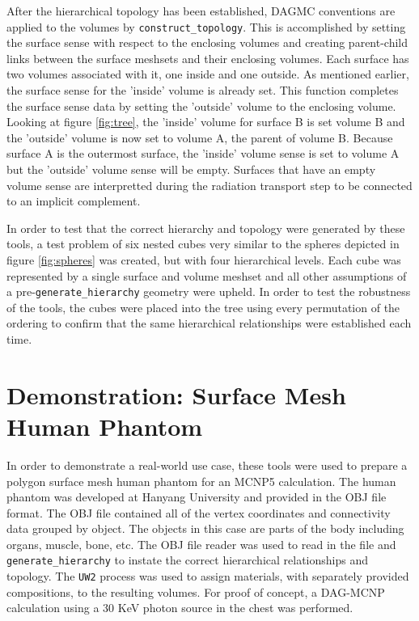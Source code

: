 \documentclass{anstrans}
\begin{document}
After the hierarchical topology has been established, DAGMC conventions are
applied to the volumes by \texttt{construct\_topology}.  This is accomplished
by setting the surface sense with respect to the enclosing volumes and
creating parent-child links between the surface meshsets and their enclosing
volumes.  Each surface has two volumes associated with it, one inside and one
outside.  As mentioned earlier, the surface sense for the 'inside' volume is
already set.  This function completes the surface sense data by setting the
'outside' volume to the enclosing volume.  Looking at figure \ref{fig:tree},
the 'inside' volume for surface B is set volume B and the 'outside' volume is
now set to volume A, the parent of volume B.  Because surface A is the
outermost surface, the 'inside' volume sense is set to volume A but the
'outside' volume sense will be empty.  Surfaces that have an empty volume
sense are interpretted during the radiation transport step to be connected to
an implicit complement.

In order to test that the correct hierarchy and topology were generated
by these tools, a test problem of six nested cubes very similar to the spheres
depicted in figure \ref{fig:spheres} was created, but with four hierarchical
levels.  Each cube was represented by a single surface and volume meshset and
all other assumptions of a pre-\texttt{generate\_hierarchy} geometry were
upheld.  In order to test the robustness of the tools, the cubes were placed
into the tree using every permutation of the ordering to confirm that the same
hierarchical relationships were established each time.

\section{Demonstration: Surface Mesh Human Phantom}

In order to demonstrate a real-world use case, these tools were used to
prepare a polygon surface mesh human phantom for an MCNP5 calculation.  The
human phantom was developed at Hanyang University and provided in the OBJ file
format. \cite{phantom} The OBJ file contained all of the vertex coordinates
and connectivity data grouped by object.  The objects in this case are parts
of the body including organs, muscle, bone, etc.  The OBJ file reader was used
to read in the file and \texttt{generate\_hierarchy} to instate the correct
hierarchical relationships and topology.  The \texttt{UW2} process was used to
assign materials, with separately provided compositions, to the resulting
volumes.  For proof of concept, a DAG-MCNP calculation using a 30 KeV photon
source in the chest was performed.
\end{document}
